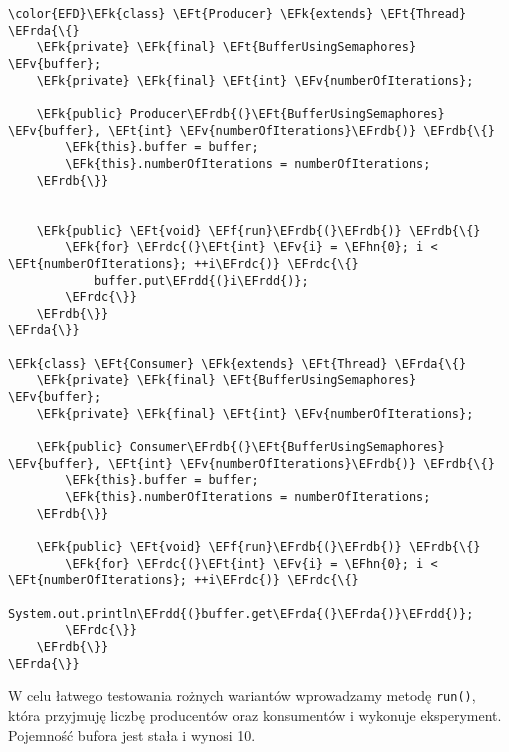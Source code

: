 \documentclass[11pt]{article}
\newcommand{\EFk}[1]{\textcolor{EFk}{#1}} %
\newcommand{\EFf}[1]{\textcolor{EFf}{#1}} %
\newcommand{\EFv}[1]{\textcolor{EFv}{#1}} %
\newcommand{\EFt}[1]{\textcolor{EFt}{#1}} %
\newcommand{\EFhn}[1]{\textcolor{EFhn}{#1}} %
\newcommand{\EFrda}[1]{#1} %
\newcommand{\EFrdb}[1]{\textcolor{EFrdb}{#1}} %
\newcommand{\EFrdc}[1]{\textcolor{EFrdc}{#1}} %
\newcommand{\EFrdd}[1]{\textcolor{EFrdd}{#1}} %
\begin{document}
\begin{Code}
\begin{Verbatim}
\color{EFD}\EFk{class} \EFt{Producer} \EFk{extends} \EFt{Thread} \EFrda{\{}
    \EFk{private} \EFk{final} \EFt{BufferUsingSemaphores} \EFv{buffer};
    \EFk{private} \EFk{final} \EFt{int} \EFv{numberOfIterations};

    \EFk{public} Producer\EFrdb{(}\EFt{BufferUsingSemaphores} \EFv{buffer}, \EFt{int} \EFv{numberOfIterations}\EFrdb{)} \EFrdb{\{}
        \EFk{this}.buffer = buffer;
        \EFk{this}.numberOfIterations = numberOfIterations;
    \EFrdb{\}}


    \EFk{public} \EFt{void} \EFf{run}\EFrdb{(}\EFrdb{)} \EFrdb{\{}
        \EFk{for} \EFrdc{(}\EFt{int} \EFv{i} = \EFhn{0}; i < \EFt{numberOfIterations}; ++i\EFrdc{)} \EFrdc{\{}
            buffer.put\EFrdd{(}i\EFrdd{)};
        \EFrdc{\}}
    \EFrdb{\}}
\EFrda{\}}

\EFk{class} \EFt{Consumer} \EFk{extends} \EFt{Thread} \EFrda{\{}
    \EFk{private} \EFk{final} \EFt{BufferUsingSemaphores} \EFv{buffer};
    \EFk{private} \EFk{final} \EFt{int} \EFv{numberOfIterations};

    \EFk{public} Consumer\EFrdb{(}\EFt{BufferUsingSemaphores} \EFv{buffer}, \EFt{int} \EFv{numberOfIterations}\EFrdb{)} \EFrdb{\{}
        \EFk{this}.buffer = buffer;
        \EFk{this}.numberOfIterations = numberOfIterations;
    \EFrdb{\}}

    \EFk{public} \EFt{void} \EFf{run}\EFrdb{(}\EFrdb{)} \EFrdb{\{}
        \EFk{for} \EFrdc{(}\EFt{int} \EFv{i} = \EFhn{0}; i < \EFt{numberOfIterations}; ++i\EFrdc{)} \EFrdc{\{}
            System.out.println\EFrdd{(}buffer.get\EFrda{(}\EFrda{)}\EFrdd{)};
        \EFrdc{\}}
    \EFrdb{\}}
\EFrda{\}}
\end{Verbatim}
\end{Code}


W celu łatwego testowania rożnych wariantów wprowadzamy metodę \texttt{run()}, która
przyjmuję liczbę producentów oraz konsumentów i wykonuje eksperyment.
Pojemność bufora jest stała i wynosi 10.
\end{document}
